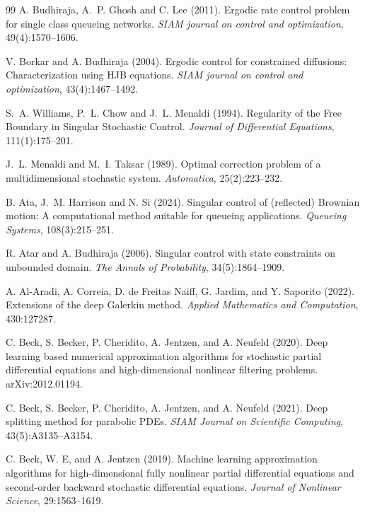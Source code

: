 \documentclass[11pt]{article}
\theoremstyle{definition}
\theoremstyle{plain}
\begin{document}
\begin{appendices}
\begin{thebibliography}{99}
 A. Budhiraja, A.~P. Ghosh and C. Lee (2011). \newblock Ergodic rate control problem for single class queueing networks. 
\newblock \emph{SIAM journal on control and optimization}, 49(4):1570--1606.

 V. Borkar and A. Budhiraja (2004). \newblock Ergodic control for constrained diffusions: Characterization using HJB equations. 
\newblock \emph{SIAM journal on control and optimization}, 43(4):1467--1492.

 S.~A. Williams, P.~L. Chow and J.~L. Menaldi (1994). \newblock Regularity of the Free Boundary in Singular Stochastic Control.
\newblock \emph{Journal of Differential Equations}, 111(1):175--201.

 J.~L. Menaldi and M.~I. Taksar (1989). \newblock Optimal correction problem of a multidimensional stochastic system. 
\newblock \emph{Automatica}, 25(2):223--232.

 B. Ata, J.~M. Harrison and N. Si (2024). \newblock Singular control of (reflected) Brownian motion: A computational method suitable for queueing applications. 
\newblock \emph{Queueing Systems}, 108(3):215--251.

 R. Atar and A. Budhiraja (2006). \newblock Singular control with state constraints on unbounded domain. 
\newblock \emph{The Annals of Probability}, 34(5):1864--1909.

 A. Al-Aradi, A. Correia, D. de Freitas Naiff, G. Jardim, and Y. Saporito (2022). \newblock Extensions of the deep Galerkin method. \newblock \emph{Applied Mathematics and Computation}, 430:127287.

 C. Beck, S. Becker, P. Cheridito, A. Jentzen, and A. Neufeld (2020). \newblock Deep learning based numerical approximation algorithms for stochastic partial differential equations and high-dimensional nonlinear filtering problems. \newblock arXiv:2012.01194.

 C. Beck, S. Becker, P. Cheridito, A. Jentzen, and A. Neufeld (2021). \newblock Deep splitting method for parabolic PDEs. \newblock \emph{SIAM Journal on Scientific Computing}, 43(5):A3135--A3154.

 C. Beck, W. E, and A. Jentzen (2019). \newblock Machine learning approximation algorithms for high-dimensional fully nonlinear partial differential equations and second-order backward stochastic differential equations. \newblock \emph{Journal of Nonlinear Science}, 29:1563--1619.


\end{thebibliography}
\end{appendices}
\end{document}
